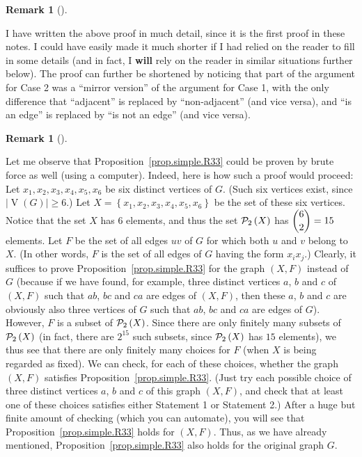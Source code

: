 \documentclass[numbers=enddot,12pt,final,onecolumn,notitlepage]{scrartcl}%
\theoremstyle{definition}
\newtheorem{remk}[theo]{Remark}
\newenvironment{remark}[1][]
{\begin{remk}[#1]\begin{leftbar}}
{\end{leftbar}\end{remk}}
\newcommand{\powset}[2][]{\ifthenelse{\equal{#2}{}}{\mathcal{P}\left(#1\right)}{\mathcal{P}_{#1}\left(#2\right)}}
\newcommand{\set}[1]{\left\{ #1 \right\}}
\newcommand{\abs}[1]{\left| #1 \right|}
\newcommand{\tup}[1]{\left( #1 \right)}
\newcommand{\verts}[1]{\operatorname{V}\left( #1 \right)}
\begin{document}
\begin{remark}
I have written the above proof in much detail, since it is the first
proof in these notes. I could have easily made it much shorter if I
had relied on the reader to fill in some details (and in fact, I
\textbf{will} rely on the reader in similar situations further below).
The proof can further be shortened by noticing that part of the
argument for Case 2 was a ``mirror version'' of the argument for
Case 1, with the only difference that ``adjacent'' is replaced by
``non-adjacent'' (and vice versa), and ``is an edge'' is replaced by
``is not an edge'' (and vice versa).
\end{remark}

\begin{remark}
Let me observe that Proposition~\ref{prop.simple.R33} could be proven
by brute force as well (using a computer). Indeed, here is how such a
proof would proceed: Let $x_1, x_2, x_3, x_4, x_5, x_6$ be six
distinct vertices of $G$. (Such six vertices exist, since
$\abs{\verts{G}} \geq 6$.) Let
$X = \set{x_1, x_2, x_3, x_4, x_5, x_6}$ be the set of these six
vertices. Notice that the set $X$ has $6$ elements, and thus the set
$\powset[2]{X}$ has $\dbinom{6}{2} = 15$ elements.
Let $F$ be the set of all edges $uv$ of $G$ for which both
$u$ and $v$ belong to $X$. (In other words, $F$ is the set of all
edges of $G$ having the form $x_i x_j$.)
Clearly, it suffices to prove Proposition~\ref{prop.simple.R33} for
the graph $\tup{X, F}$ instead of $G$ (because if we have found, for
example, three distinct vertices $a$, $b$ and $c$ of $\tup{X, F}$ such
that $ab$, $bc$ and $ca$ are edges of $\tup{X, F}$, then these $a$,
$b$ and $c$ are obviously also three vertices of $G$ such that
$ab$, $bc$ and $ca$ are edges of $G$). However,
$F$ is a subset of $\powset[2]{X}$. Since there
are only finitely many subsets of $\powset[2]{X}$ (in fact, there are
$2^{15}$ such subsets, since $\powset[2]{X}$ has $15$ elements), we
thus see that there are only finitely many choices for $F$ (when $X$
is being regarded as fixed). We can
check, for each of these choices, whether the graph $\tup{X, F}$
satisfies Proposition~\ref{prop.simple.R33}. (Just try each
possible choice of three distinct vertices $a$, $b$ and $c$ of this
graph $\tup{X, F}$, and check that at least one of these choices
satisfies either Statement 1 or Statement 2.) After a huge but
finite amount of checking (which you can automate), you will see that
Proposition~\ref{prop.simple.R33} holds for $\tup{X, F}$. Thus, as we
have already mentioned, Proposition~\ref{prop.simple.R33} also holds
for the original graph $G$.
\end{remark}
\end{document}
